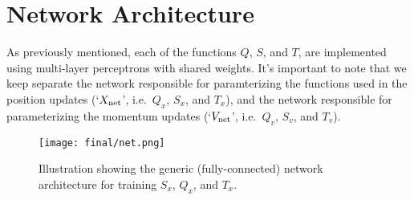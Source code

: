 \section{Network Architecture}%
\label{subsec:l2hmc_network}
As previously mentioned, each of the functions $Q$, $S$, and $T$, are
implemented using multi-layer perceptrons with shared weights.
%
It's important to note that we keep separate the network responsible for
paramterizing the functions used in the position updates (`${X_{\mathrm{net}}}$', i.e.\
$Q_x$, $S_x$, and $T_x$), and the network responsible for parameterizing the
momentum updates (`${V_{\mathrm{net}}}$', i.e.\ $Q_v$, $S_v$, and $T_v$).
%
%
\begin{figure}[htpb]
  \centering
  \texttt{[image: final/net.png]}
  \caption{Illustration showing the generic (fully-connected) network
    architecture for training $S_x$, $Q_x$, and $T_x$.}%
    \label{fig:xnet}
\end{figure}

%   
%


